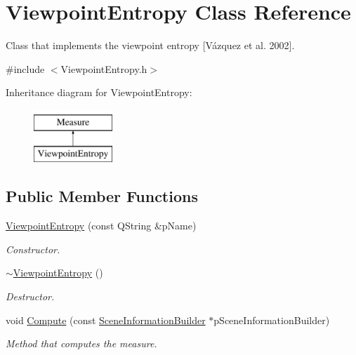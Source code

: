 \hypertarget{class_viewpoint_entropy}{\section{Viewpoint\+Entropy Class Reference}
\label{class_viewpoint_entropy}
}


Class that implements the viewpoint entropy \mbox{[}Vázquez et al. 2002\mbox{]}.  




{\ttfamily \#include $<$Viewpoint\+Entropy.\+h$>$}

Inheritance diagram for Viewpoint\+Entropy\+:\begin{figure}[H]
\begin{center}
\leavevmode
\includegraphics[height=2.000000cm]{class_viewpoint_entropy}
\end{center}
\end{figure}
\subsection*{Public Member Functions}
\begin{DoxyCompactItemize}
\item 
\hyperlink{class_viewpoint_entropy_aa1167cb7192e3df3064e107b9fe80d67}{Viewpoint\+Entropy} (const Q\+String \&p\+Name)
\begin{DoxyCompactList}\small\item\em Constructor. \end{DoxyCompactList}\item 
\hyperlink{class_viewpoint_entropy_ac2f73d309bc0c34cb16ceaf7d8044eba}{$\sim$\+Viewpoint\+Entropy} ()
\begin{DoxyCompactList}\small\item\em Destructor. \end{DoxyCompactList}\item 
void \hyperlink{class_viewpoint_entropy_a40a2582d4d4e99794a2455686a50d3fc}{Compute} (const \hyperlink{class_scene_information_builder}{Scene\+Information\+Builder} $\ast$p\+Scene\+Information\+Builder)
\begin{DoxyCompactList}\small\item\em Method that computes the measure. \end{DoxyCompactList}\end{DoxyCompactItemize}
